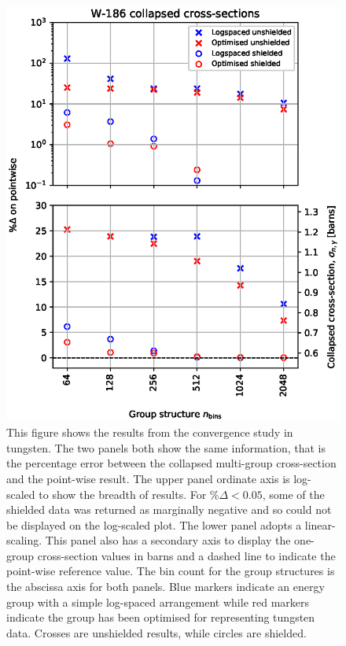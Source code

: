 \begin{figure}[H]
  \centering
  \includegraphics[width=0.9\linewidth]{W186_lin_log}
  \caption[$^{186}$W(n,$\gamma$)$^{187}$W collapsed cross-sections for log-spaced and optimised group structures.]{This figure shows the results from the convergence study in tungsten. The two panels both show the same information, that is the percentage error between the collapsed multi-group cross-section and the point-wise result. The upper panel ordinate axis is log-scaled to show the breadth of results. For $\%\Delta < 0.05$, some of the shielded data was returned as marginally negative and so could not be displayed on the log-scaled plot. The lower panel adopts a linear-scaling. This panel also has a secondary axis to display the one-group cross-section values in barns and a dashed line to indicate the point-wise reference value. The bin count for the group structures is the abscissa axis for both panels. Blue markers indicate an energy group with a simple log-spaced arrangement while red markers indicate the group has been optimised for representing tungsten data. Crosses are unshielded results, while circles are shielded.}
  \label{fig:W186_convergence}
\end{figure}

